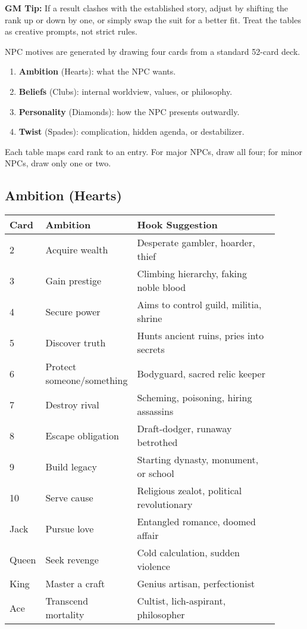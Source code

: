 \documentclass[12pt]{book}
\begin{document}
\noindent \textbf{GM Tip:} If a result clashes with the established story, adjust by shifting the rank up or down by one, or simply swap the suit for a better fit. Treat the tables as creative prompts, not strict rules.

\noindent NPC motives are generated by drawing four cards from a standard 52-card deck.  
\begin{enumerate}
  \item \textbf{Ambition} (Hearts): what the NPC wants.  
  \item \textbf{Beliefs} (Clubs): internal worldview, values, or philosophy.  
  \item \textbf{Personality} (Diamonds): how the NPC presents outwardly.  
  \item \textbf{Twist} (Spades): complication, hidden agenda, or destabilizer.  
\end{enumerate}

Each table maps card rank to an entry. For major NPCs, draw all four; for minor NPCs, draw only one or two.

\subsection*{Ambition (Hearts)}
\begin{longtable}{|p{0.1\linewidth}|p{0.25\linewidth}|p{0.55\linewidth}|}
\hline
\textbf{Card} & \textbf{Ambition} & \textbf{Hook Suggestion} \\
\hline
2 & Acquire wealth & Desperate gambler, hoarder, thief \\
3 & Gain prestige & Climbing hierarchy, faking noble blood \\
4 & Secure power & Aims to control guild, militia, shrine \\
5 & Discover truth & Hunts ancient ruins, pries into secrets \\
6 & Protect someone/something & Bodyguard, sacred relic keeper \\
7 & Destroy rival & Scheming, poisoning, hiring assassins \\
8 & Escape obligation & Draft-dodger, runaway betrothed \\
9 & Build legacy & Starting dynasty, monument, or school \\
10 & Serve cause & Religious zealot, political revolutionary \\
Jack & Pursue love & Entangled romance, doomed affair \\
Queen & Seek revenge & Cold calculation, sudden violence \\
King & Master a craft & Genius artisan, perfectionist \\
Ace & Transcend mortality & Cultist, lich-aspirant, philosopher \\
\hline
\end{longtable}
\end{document}
